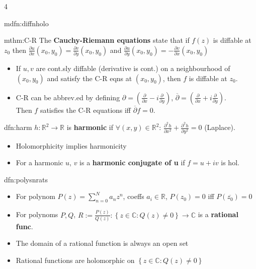 \documentclass[landscape, 8pt]{extarticle}
\begin{document}
\begin{multicols*}{4}
\begin{mdfn}{mdfn:diffnholo}{ }
		\end{mdfn}
		
		
		\begin{mthm}{mthm:C-R}{ }
			The \textbf{Cauchy-Riemann equations} state that if $f(z)$ is diffable at $z_0$ then $\frac{\partial u}{\partial x}(x_0, y_0) = \frac{\partial  v}{\partial  y}(x_0, y_0)$ and $\frac{\partial  u}{\partial  y}(x_0, y_0) = - \frac{\partial  v}{\partial  x}(x_0, y_0)$
			
			\begin{itemize}
				\item If $u, v$ are cont.sly diffable (derivative is cont.) on a neighbourhood of $(x_0, y_0)$ and satisfy the C-R eqns at $(x_0, y_0)$, then $f$ is diffable at $z_0$.
				\item C-R can be abbrev.ed by defining $\partial = \left(\frac{\partial }{\partial x} - i \frac{\partial }{\partial  y}\right)$, $\overline{\partial } = \left(\frac{\partial }{\partial x} + i \frac{\partial }{\partial  y} \right)$. \\
				Then $f$ satisfies the C-R equations iff $\overline{\partial }f = 0$.
			
			\end{itemize}
			
		\end{mthm}
		
		
		\begin{dfn}{dfn:harm}{ }
			$h: \mathbb{R}^2 \to \mathbb{R}$ is \textbf{harmonic} if $\forall (x, y) \in \mathbb{R}^2$: $\frac{\partial^2 h}{\partial x^2} + \frac{\partial^2 h}{\partial y^2} = 0$ (Laplace).
			\begin{itemize}
				\item Holomorphicity implies harmonicity
				\item For a harmonic $u$, $v$ is a \textbf{harmonic conjugate of u} if $f = u + iv$ is hol.
			\end{itemize}
			
		\end{dfn}
		
		
		\begin{dfn}{dfn:polysnrats}{ }
			\begin{itemize}
				\item For polynom $P(z) = \sum_{n=0}^{N} a_n z^n$, coeffs $a_i \in \mathbb{R}$, $P(z_0) = 0$ iff $P(\overline{z_0}) = 0$
				\item For polynoms $P, Q$, $R:= \frac{P(z)}{Q(z)}: \left\{z \in \mathbb{C}: Q(z) \ne 0\right\} \to \mathbb{C}$ is a \textbf{rational func}.
				\item The domain of a rational function is always an open set
				\item Rational functions are holomorphic on $\left\{z \in \mathbb{C}: Q(z) \ne 0\right\}$
			\end{itemize}
			

\end{dfn}
\end{multicols*}
\end{document}
